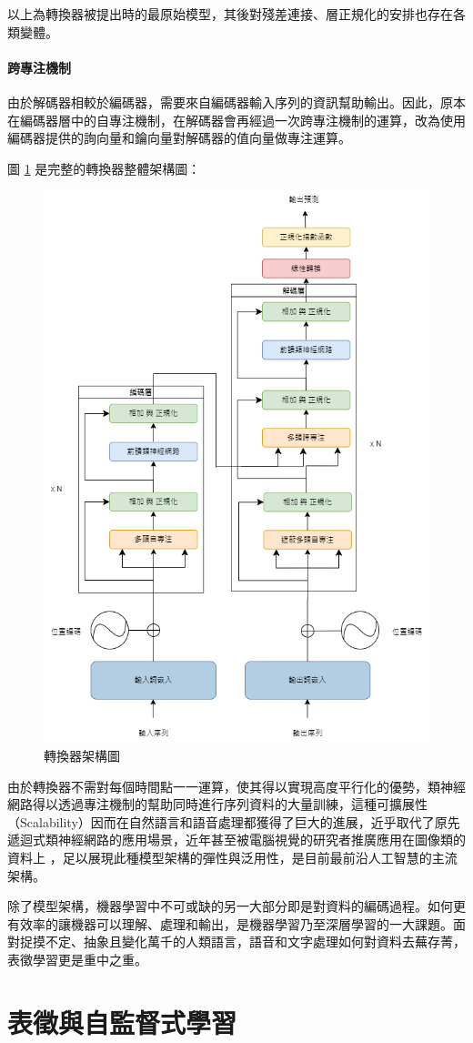 以上為轉換器被提出時的最原始模型，其後對殘差連接、層正規化的安排也存在各類變體。

\paragraph{跨專注機制}

由於解碼器相較於編碼器，需要來自編碼器輸入序列的資訊幫助輸出。因此，原本在編碼器層中的自專注機制，在解碼器會再經過一次跨專注機制的運算，改為使用編碼器提供的詢向量和鑰向量對解碼器的值向量做專注運算。

圖 \ref{fig:tfm_arch} 是完整的轉換器整體架構圖：
\begin{figure}
    \centering
    \includegraphics[width=0.5\linewidth]{figures/tfm_arch.drawio.png}
    \caption{轉換器架構圖}
    \label{fig:tfm_arch}
\end{figure}

由於轉換器不需對每個時間點一一運算，使其得以實現高度平行化的優勢，類神經網路得以透過專注機制的幫助同時進行序列資料的大量訓練，這種可擴展性（Scalability）因而在自然語言和語音處理都獲得了巨大的進展，近乎取代了原先遞迴式類神經網路的應用場景，近年甚至被電腦視覺的研究者推廣應用在圖像類的資料上 \cite{dosovitskiy2021image}，足以展現此種模型架構的彈性與泛用性，是目前最前沿人工智慧的主流架構。

除了模型架構，機器學習中不可或缺的另一大部分即是對資料的編碼過程。如何更有效率的讓機器可以理解、處理和輸出，是機器學習乃至深層學習的一大課題。面對捉摸不定、抽象且變化萬千的人類語言，語音和文字處理如何對資料去蕪存菁，表徵學習更是重中之重。

\section{表徵與自監督式學習}

